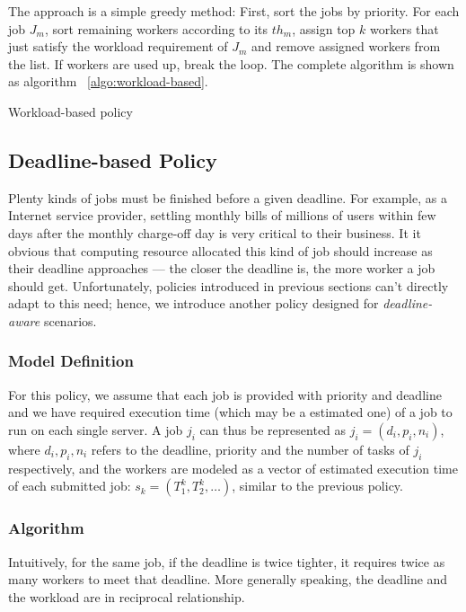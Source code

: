 The approach is a simple greedy method:
First, sort the jobs by priority.
For each job $J_m$, sort remaining workers according to its $th_m$,
assign top $k$ workers that just satisfy the workload requirement of
$J_m$ and remove assigned workers from the list.
If workers are used up, break the loop.
The complete algorithm is shown as algorithm ~\ref{algo:workload-based}.

\begin{algorithm}[H]
  
  \caption{Workload-based policy}
  \label{algo:workload-based}
\end{algorithm}

\subsection{Deadline-based Policy}

Plenty kinds of jobs must be finished before a given deadline.
For example, as a Internet service provider, settling monthly bills of
millions of users within few days after the monthly charge-off day is
very critical to their business.
It it obvious that computing resource allocated this kind of job should
increase as their deadline approaches --- the closer the deadline is, the
more worker a job should get.
Unfortunately, policies introduced in previous sections can't directly
adapt to this need; hence, we introduce another policy designed for
\emph{deadline-aware} scenarios.

\subsubsection{Model Definition}

For this policy, we assume that each job is provided with priority and
deadline and we have required execution time (which may be a estimated
one) of a job to run on each single server.
A job $j_i$ can thus be represented as $j_i = (d_i, p_i, n_i)$, where
$d_i, p_i, n_i$ refers to the deadline, priority and the number of tasks
of $j_i$ respectively, and the workers are modeled as a vector of
estimated execution time of each submitted job: $s_k = (T^k_1, T^k_2,
\ldots)$, similar to the previous policy.

\subsubsection{Algorithm}

Intuitively, for the same job, if the deadline is twice tighter, it
requires twice as many workers to meet that deadline.
More generally speaking, the deadline and the workload are in reciprocal
relationship.

